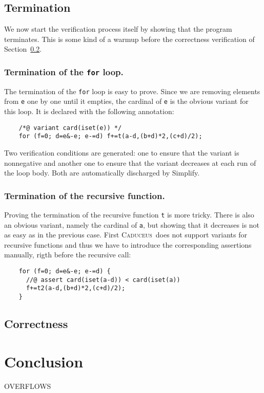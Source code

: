 \documentclass[a4paper]{llncs}
\newcommand{\caduceus}{\textsc{Caduceus}}
\begin{document}
\subsection{Termination}

We now start the verification process itself by showing that the
program terminates. This is some kind of a warmup before the
correctness verification of Section~\ref{correctness}.

\subsubsection{Termination of the \texttt{for} loop.}
The termination of the \texttt{for} loop is easy to prove.
Since we are removing elements from \texttt{e} one by one until it
empties, the cardinal of \texttt{e} is the obvious variant for this
loop. It is declared with the following annotation:
\begin{verbatim}
    /*@ variant card(iset(e)) */
    for (f=0; d=e&-e; e-=d) f+=t(a-d,(b+d)*2,(c+d)/2);
\end{verbatim}
Two verification conditions are generated: one to ensure that the
variant is nonnegative and another one to ensure that the variant
decreases at each run of the loop body. Both are automatically
discharged by Simplify.

\subsubsection{Termination of the recursive function.}
Proving the termination of the recursive function \texttt{t} is more
tricky. There is also an obvious variant, namely the cardinal of
\texttt{a}, but showing that it decreases is not as easy as in the
previous case. First \caduceus\ does not support variants for
recursive functions and thus we have to introduce the corresponding
assertions manually, rigth before the recursive call:
\begin{verbatim}
    for (f=0; d=e&-e; e-=d) {
      //@ assert card(iset(a-d)) < card(iset(a))
      f+=t2(a-d,(b+d)*2,(c+d)/2); 
    }
\end{verbatim}


\subsection{Correctness}\label{correctness}

\section{Conclusion}

OVERFLOWS

\nocite{*}


\end{document}
